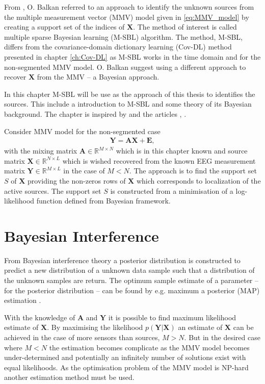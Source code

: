 From \cite{phd2015}, O. Balkan referred to an approach to identify the unknown sources from the multiple measurement vector (MMV) model given in \ref{eq:MMV_model} by creating a support set of the indices of $\mathbf{X}$. The method of interest is called multiple sparse Bayesian learning (M-SBL) algorithm.
The method, M-SBL, differs from the covariance-domain dictionary learning (Cov-DL) method presented in chapter \ref{ch:Cov-DL} as M-SBL works in the time domain and for the non-segmented MMV model. O. Balkan suggest using a different approach to recover $\mathbf{X}$ from the MMV -- a Bayesian approach.

In this chapter M-SBL will be use as the approach of this thesis to identifies the sources. This include a introduction to M-SBL and some theory of its Bayesian background. The chapter is inspired by \cite{phd_wipf} and the articles \cite{article_wipf}, \cite{Balkan2014}.

Consider MMV model for the non-segmented case
\begin{align*}
\mathbf{Y} = \mathbf{AX} + \mathbf{E},
\end{align*}
with the mixing matrix $\mathbf{A} \in \mathbb{R}^{M \times N}$ which is in this chapter known and source matrix $\mathbf{X} \in \mathbb{R}^{N \times L}$ which is wished recovered from the known EEG measurement matrix $\mathbf{Y} \in \mathbb{R}^{M \times L}$ in the case of $M < N$. 
The approach is to find the support set $S$ of $\textbf{X}$ providing the non-zeros rows of $\mathbf{X}$ which corresponds to localization of the active sources. The support set $S$ is constructed from a minimisation of a log-likelihood function defined from Bayesian framework.

\section{Bayesian Interference}
From Bayesian interference theory a posterior distribution is constructed to predict a new distribution of a unknown data sample such that a distribution of the unknown samples are return. The optimum sample estimate of a parameter -- for the posterior distribution -- can be found by e.g. maximum a posterior (MAP) estimation .

With the knowledge of $\mathbf{A}$ and $\mathbf{Y}$ it is possible to find maximum likelihood estimate of $\textbf{X}$. 
By maximising the likelihood $p(\mathbf{Y} \vert \mathbf{X})$ an estimate of $\mathbf{X}$ can be achieved in the case of more sensors than sources, $M > N$. 
But in the desired case where $M < N$ the estimation becomes complicate as the MMV model becomes under-determined and potentially an infinitely number of solutions exist with equal likelihoods.
As the optimisation problem of the MMV model is NP-hard another estimation method must be used.

